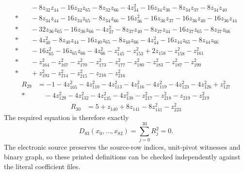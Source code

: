 \begin{align*}
&\quad{}-8z_{32} z_{44}-16z_{32} z_{65}-8z_{32} z_{66}-4z_{34}^{2}-16z_{34} z_{36}-8z_{34} z_{37}-8z_{34} z_{40}\\*
&\quad{}-8z_{34} z_{44}-16z_{34} z_{65}-8z_{34} z_{66}-16z_{36}^{2}-16z_{36} z_{37}-16z_{36} z_{40}-16z_{36} z_{44}\\*
&\quad{}-32z_{36} z_{65}-16z_{36} z_{66}-4z_{37}^{2}-8z_{37} z_{40}-8z_{37} z_{44}-16z_{37} z_{65}-8z_{37} z_{66}\\*
&\quad{}-4z_{40}^{2}-8z_{40} z_{44}-16z_{40} z_{65}-8z_{40} z_{66}-4z_{44}^{2}-16z_{44} z_{65}-8z_{44} z_{66}\\*
&\quad{}-16z_{65}^{2}-16z_{65} z_{66}-4z_{66}^{2}-z_{145}^{2}-z_{153}^{2}+2z_{158}-z_{158}^{2}-z_{161}^{2}\\*
&\quad{}-z_{164}^{2}-z_{167}^{2}-z_{170}^{2}-z_{173}^{2}-z_{177}^{2}-z_{180}^{2}-z_{183}^{2}-z_{187}^{2}-z_{190}^{2}\\*
&\quad{}+z_{193}^{2}-z_{214}^{2}-z_{215}^{2}-z_{216}-z_{216}^{2}
\end{align*}
\begin{align*}
R_{29}&=-1-4z_{105}^{2}-4z_{110}^{2}-4z_{113}^{2}-4z_{116}^{2}-4z_{119}^{2}-4z_{123}^{2}-4z_{126}^{2}+z_{127}^{2}\\*
&\quad{}-4z_{129}^{2}-4z_{132}^{2}-4z_{135}^{2}-4z_{138}^{2}-z_{217}^{2}-z_{218}^{2}-z_{219}-z_{219}^{2}
\end{align*}
\begin{align*}
R_{30}&=5+z_{140}+8z_{141}-8z_{141}^{2}-z_{223}^{2}
\end{align*}
\endgroup
The required equation is therefore exactly
\[D_{83}(x_0,\ldots,x_{82})=\sum_{j=0}^{30}R_j^2=0.\]
The electronic source preserves the source-row indices, unit-pivot witnesses and binary graph, so these printed definitions can be checked independently against the literal coefficient files.
